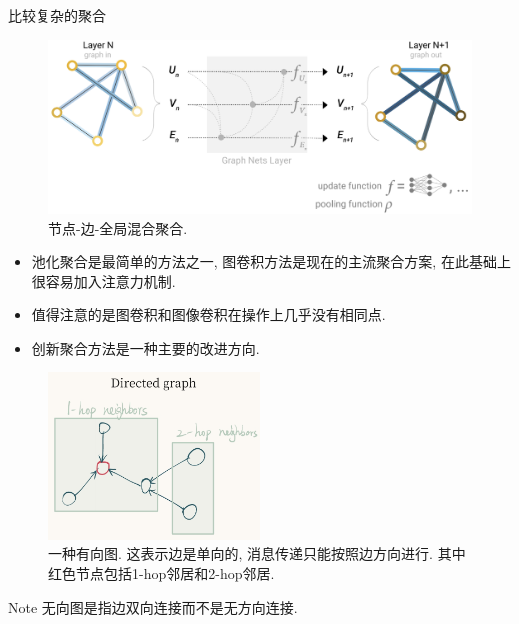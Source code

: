 \documentclass{beamer}
\begin{document}
\begin{frame}{比较复杂的聚合}
    \begin{figure}
        \includegraphics[width=\textwidth]{节点边全局聚合.png}
        \caption{节点-边-全局混合聚合.}
    \end{figure}
\end{frame}

\begin{frame}
    \begin{itemize}
        \item 池化聚合是最简单的方法之一, 图卷积方法是现在的主流聚合方案, 在此基础上很容易加入注意力机制. 
        \item 值得注意的是图卷积和图像卷积在操作上几乎没有相同点.
        \item 创新聚合方法是一种主要的改进方向.
    \end{itemize}
\end{frame}

\begin{frame}
    \begin{figure}
        \includegraphics[width=0.5\textwidth]{有向图.png}
        \caption{一种有向图. 这表示边是单向的, 消息传递只能按照边方向进行. 其中红色节点包括1-hop邻居和2-hop邻居.}
    \end{figure}
    \begin{block}{Note}
        无向图是指边双向连接而不是无方向连接.
    \end{block}
\end{frame}
\end{document}
